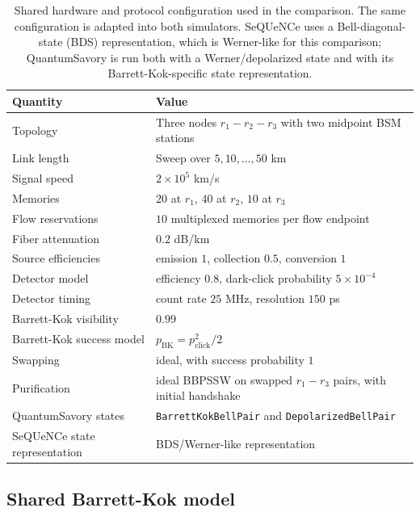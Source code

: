 \begin{table}[t]
    \caption{Shared hardware and protocol configuration used in the comparison.
    The same configuration is adapted into both simulators.  SeQUeNCe uses a
    Bell-diagonal-state (BDS) representation, which is Werner-like for this
    comparison; QuantumSavory is run both with a Werner/depolarized state and
    with its Barrett-Kok-specific state representation.}
    \label{tab:sequence_qsavory_config}
    \begin{ruledtabular}
    \begin{tabular}{ll}
    Quantity & Value \\
    \hline
    Topology & Three nodes $r_1-r_2-r_3$ with two midpoint BSM stations \\
    Link length & Sweep over $5,10,\ldots,50$ km \\
    Signal speed & $2\times 10^5$ km/s \\
    Memories & $20$ at $r_1$, $40$ at $r_2$, $10$ at $r_3$ \\
    Flow reservations & $10$ multiplexed memories per flow endpoint \\
    Fiber attenuation & $0.2$ dB/km \\
    Source efficiencies & emission $1$, collection $0.5$, conversion $1$ \\
    Detector model & efficiency $0.8$, dark-click probability $5\times10^{-4}$ \\
    Detector timing & count rate $25$ MHz, resolution $150$ ps \\
    Barrett-Kok visibility & $0.99$ \\
    Barrett-Kok success model & $p_{\mathrm{BK}}=p_{\mathrm{click}}^2/2$ \\
    Swapping & ideal, with success probability $1$ \\
    Purification & ideal BBPSSW on swapped $r_1-r_3$ pairs, with initial handshake \\
    QuantumSavory states & \texttt{BarrettKokBellPair} and \texttt{DepolarizedBellPair} \\
    SeQUeNCe state representation & BDS/Werner-like representation \\
    \end{tabular}
    \end{ruledtabular}
\end{table}

\subsection{Shared Barrett-Kok model}

